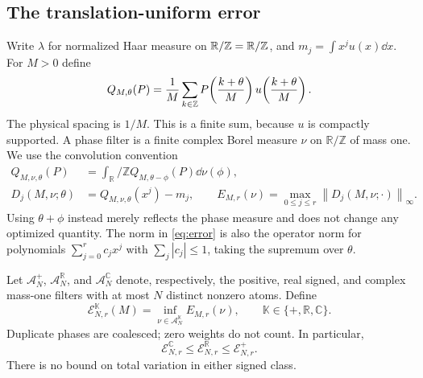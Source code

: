 \documentclass[11pt,a4paper]{article}
\numberwithin{equation}{section}
\theoremstyle{plain}
\theoremstyle{definition}
\theoremstyle{remark}
\newcommand{\R}{\mathbb R}\newcommand{\C}{\mathbb C}
\newcommand{\T}{\mathbb R/\mathbb Z}
\newcommand{\norm}[1]{\left\lVert#1\right\rVert}
\newcommand{\Err}{\mathcal E}
\begin{document}
\subsection{The translation-uniform error}

Write $\lambda$ for normalized Haar measure on $\T=\R/\Z$, and
$m_j=\int x^ju(x)\dd x$. For $M>0$ define
\begin{equation}\label{eq:Q}
 Q_{M,\theta}(P)=\frac1M\sum_{k\in\mathbb Z}
 P\!\left(\frac{k+\theta}{M}\right)
 u\!\left(\frac{k+\theta}{M}\right).
\end{equation}
The physical spacing is $1/M$. This is a finite sum, because $u$ is compactly
supported. A phase filter is a finite complex Borel measure $\nu$ on $\T$ of
mass one. We use the convolution convention
\begin{align}
 Q_{M,\nu,\theta}(P)&=\int_\T Q_{M,\theta-\phi}(P)\dd\nu(\phi),
 \label{eq:averaged}\\
 D_j(M,\nu;\theta)&=Q_{M,\nu,\theta}(x^j)-m_j,
 \qquad
 E_{M,r}(\nu)=\max_{0\le j\le r}\norm{D_j(M,\nu;\cdot)}_\infty.
 \label{eq:error}
\end{align}
Using $\theta+\phi$ instead merely reflects the phase measure and does not
change any optimized quantity. The norm in \eqref{eq:error} is also the
operator norm for polynomials $\sum_{j=0}^r c_jx^j$ with
$\sum_j|c_j|\le1$, taking the supremum over $\theta$.

Let $\mathcal A_N^+$, $\mathcal A_N^{\R}$, and $\mathcal A_N^{\C}$ denote,
respectively, the positive, real signed, and complex mass-one filters with
at most $N$ distinct nonzero atoms. Define
\begin{equation}\label{eq:optimal}
 \Err_{N,r}^{\mathbb K}(M)=
 \inf_{\nu\in\mathcal A_N^{\mathbb K}} E_{M,r}(\nu),
 \qquad \mathbb K\in\{+,\R,\C\}.
\end{equation}
Duplicate phases are coalesced; zero weights do not count. In particular,
\begin{equation}\label{eq:classes}
 \Err_{N,r}^{\C}\le\Err_{N,r}^{\R}\le\Err_{N,r}^{+}.
\end{equation}
There is no bound on total variation in either signed class.
\end{document}

